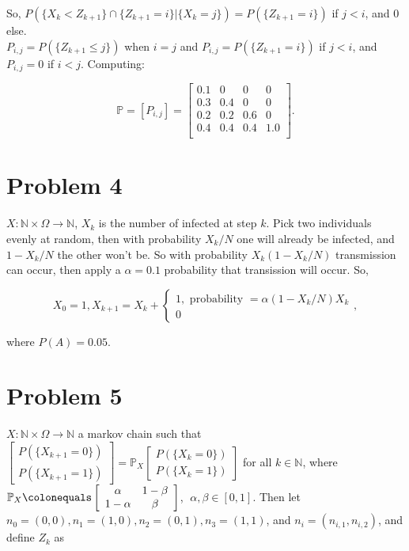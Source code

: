 \documentclass[12pt]{article}
\newcommand{\nats}[0] { \mathbb{N}}
\newcommand{\Om}[0] { \Omega }
\newcommand{\rarw}[0] { \rightarrow }
\newcommand{ \defeq }[0] { \colonequals }
\begin{document}
\noindent
So, $P( \{  X_k < Z_{k+1} \} \cap \{ Z_{k+1}= i \} | \{ X_{k} = j \} ) = P( \{ Z_{k+1}= i \} ) $ if $j < i$, and 0 else. \\

\noindent
$P_{i,j} = P( \{  Z_{k+1} \le j \}  ) $ when $i = j$ and $P_{i,j} = P( \{ Z_{k+1}= i \} ) $ if $j < i$, and $P_{i,j} = 0$ if $i < j$. Computing:


$$
\mathbb{P} = [P_{i,j}] = \left[ \begin{array}{cccc} 
0.1  & 0  & 0 & 0 \\
0.3 & 0.4 & 0  & 0  \\
0.2 & 0.2 & 0.6 & 0 \\
0.4 & 0.4 & 0.4 & 1.0    \\
\end{array} \right].
$$




\section*{Problem 4}

$X: \nats \times \Om \rarw \nats$, $X_k$ is the number of infected at step $k$. Pick two individuals evenly at random, then with probability $X_k/N$ one will already be infected, and $1-X_k/N$ the other won't be. So with probability $X_k(1-X_k/N)$ transmission can occur, then apply a $ \alpha = 0.1$ probability that transission will occur. So,

$$
X_0 = 1, X_{k+1} = X_k + \left\{ \begin{array}{c}  1, \textrm{ probability } = \alpha ( 1-X_k/N )X_k \\   0  \end{array} \right.  ,
$$

\noindent
where $P(A) = 0.05$.






\section*{Problem 5}




$X: \nats \times \Om \rarw \nats$ a markov chain such that $ \left[ \begin{array}{c} P( \{ X_{k+1} = 0 \} ) \\ P( \{ X_{k+1} =1 \} ) \end{array} \right]  = \mathbb{P}_X \left[ \begin{array}{c} P( \{ X_{k} = 0 \} ) \\ P( \{ X_{k} =1 \} ) \end{array} \right] $ for all $k \in \nats$, where $ \mathbb{P}_X \defeq \left[ \begin{array}{cc} \alpha & 1-\beta \\ 1-\alpha & \beta \end{array} \right]$, $ \; \alpha, \beta \in [0,1]$. Then let $n_0 = (0,0), n_1= (1,0), n_2 = (0,1), n_3 = (1,1)$, and $n_i = (n_{i,1}, n_{i,2})$, and define $Z_k$ as
\end{document}
